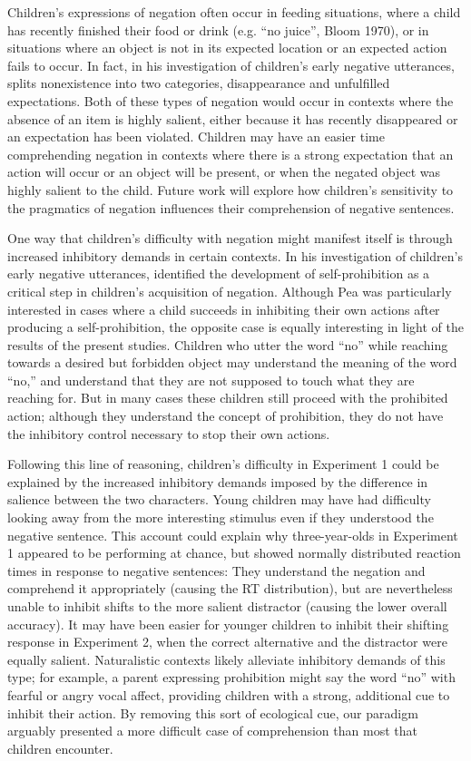 \documentclass[man]{apa2}
\begin{document}
Children's expressions of negation often occur in feeding situations, where a child has recently finished their food or drink (e.g. ``no juice'', Bloom 1970), or in situations where an object is not in its expected location or an expected action fails to occur.  In fact, in his investigation of children's early negative utterances,  splits nonexistence into two categories, disappearance and unfulfilled expectations.  Both of these types of negation would occur in contexts where the absence of an item is highly salient, either because it has recently disappeared or an expectation has been violated.  Children may have an easier time comprehending negation in contexts where there is a strong expectation that an action will occur or an object will be present, or when the negated object was highly salient to the child.  Future work will explore how children's sensitivity to the pragmatics of negation influences their comprehension of negative sentences.

One way that children's difficulty with negation might manifest itself is through increased inhibitory demands in certain contexts.  In his investigation of children's early negative utterances,  identified the development of self-prohibition as a critical step in children's acquisition of negation.  Although Pea was particularly interested in cases where a child succeeds in inhibiting their own actions after producing a self-prohibition, the opposite case is equally interesting in light of the results of the present studies.  Children who utter the word ``no'' while reaching towards a desired but forbidden object may understand the meaning of the word ``no,'' and understand that they are not supposed to touch what they are reaching for.  But in many cases these children still proceed with the prohibited action; although they understand the concept of prohibition, they do not have the inhibitory control necessary to stop their own actions. 

Following this line of reasoning, children's difficulty in Experiment 1 could be explained by the increased inhibitory demands imposed by the difference in salience between the two characters. Young children may have had difficulty looking away from the more interesting stimulus even if they understood the negative sentence. This account could explain why three-year-olds in Experiment 1 appeared to be performing at chance, but showed normally distributed reaction times in response to negative sentences: They understand the negation and comprehend it appropriately (causing the RT distribution), but are nevertheless unable to inhibit shifts to the more salient distractor (causing the lower overall accuracy). It may have been easier for younger children to inhibit their shifting response in Experiment 2, when the correct alternative and the distractor were equally salient.  Naturalistic contexts likely alleviate inhibitory demands of this type; for example, a parent expressing prohibition might say the word ``no'' with fearful or angry vocal affect, providing children with a strong, additional cue to inhibit their action. By removing this sort of ecological cue, our paradigm arguably presented a more difficult case of comprehension than most that children encounter.
\end{document}

